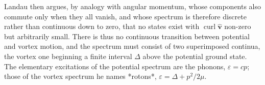 Landau then argues, by analogy with angular momentum, whose components also commute only when they all vanish, and whose spectrum is therefore discrete rather than continuous down to zero, that no states exist with $\operatorname{curl}\hat{\mathbf v}$ non-zero but arbitrarily small. There is thus no continuous transition between potential and vortex motion, and the spectrum must consist of two superimposed continua, the vortex one beginning a finite interval $\Delta$ above the potential ground state.  The elementary excitations of the potential spectrum are the phonons, $\varepsilon = cp$; those of the vortex spectrum he names *rotons*, $\varepsilon = \Delta + p^2/2\mu$.

